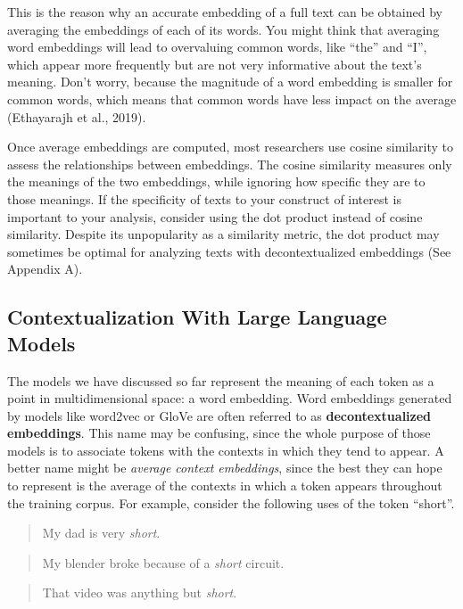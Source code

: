 \documentclass[
  man,
  floatsintext,
  longtable,
  nolmodern,
  notxfonts,
  notimes,
  colorlinks=true,linkcolor=blue,citecolor=blue,urlcolor=blue]{apa7}
\begin{document}
This is the reason why an accurate embedding of a full text can be
obtained by averaging the embeddings of each of its words. You might
think that averaging word embeddings will lead to overvaluing common
words, like ``the'' and ``I'', which appear more frequently but are not
very informative about the text's meaning. Don't worry, because the
magnitude of a word embedding is smaller for common words, which means
that common words have less impact on the average (Ethayarajh et al.,
2019).

Once average embeddings are computed, most researchers use cosine
similarity to assess the relationships between embeddings. The cosine
similarity measures only the meanings of the two embeddings, while
ignoring how specific they are to those meanings. If the specificity of
texts to your construct of interest is important to your analysis,
consider using the dot product instead of cosine similarity. Despite its
unpopularity as a similarity metric, the dot product may sometimes be
optimal for analyzing texts with decontextualized embeddings (See
Appendix A).

\subsection{Contextualization With Large Language
Models}\label{contextualization-with-large-language-models}

The models we have discussed so far represent the meaning of each token
as a point in multidimensional space: a word embedding. Word embeddings
generated by models like word2vec or GloVe are often referred to as
\textbf{decontextualized embeddings}. This name may be confusing, since
the whole purpose of those models is to associate tokens with the
contexts in which they tend to appear. A better name might be
\emph{average context embeddings}, since the best they can hope to
represent is the average of the contexts in which a token appears
throughout the training corpus. For example, consider the following uses
of the token ``short''.

\begin{quote}
My dad is very \emph{short}.
\end{quote}

\begin{quote}
My blender broke because of a \emph{short} circuit.
\end{quote}

\begin{quote}
That video was anything but \emph{short}.
\end{quote}
\end{document}
